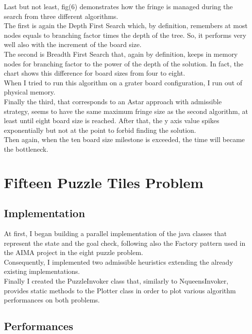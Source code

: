 \documentclass{article}
\begin{document}
Last but not least, fig(6) demonstrates how the fringe is managed during the search from three different algorithms.\\
The first is again the Depth First Search which, by definition, remembers at most nodes equals to branching factor times the depth of the tree. So, it performs very well also with the increment of the board size.\medskip\\
The second is Breadth First Search that, again by definition, keeps in memory nodes for branching factor to the power of the depth of the solution. In fact, the chart shows this difference for board sizes from four to eight.\\
When I tried to run this algorithm on a grater board configuration, I run out of physical memory. \\
Finally the third, that corresponds to an Astar approach with admissible strategy, seems to have the same maximum fringe size as the second algorithm, at least until eight board size is reached. After that, the y axis value spikes exponentially but not at the point to forbid finding the solution.\\
Then again, when the ten board size milestone is exceeded, the time will became the bottleneck.

				\section{Fifteen Puzzle Tiles Problem}
					\subsection{Implementation}
					At first, I began building a parallel implementation of the java classes that represent the state and the goal check, following also the Factory pattern used in the AIMA project in the eight puzzle problem.\\
					Consequently, I implemented two admissible heuristics extending the already existing implementations.\\
					Finally I created the PuzzleInvoker class that, similarly to NqueensInvoker, provides static methods to the Plotter class in order to plot various algorithm performances on both problems.
					\subsection{Performances}
																	
\end{document}
